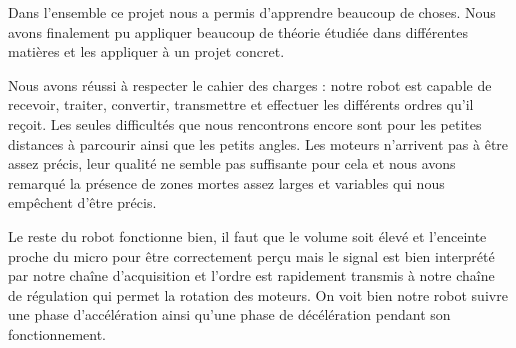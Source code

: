Dans l’ensemble ce projet nous a permis d’apprendre beaucoup de choses. Nous avons finalement pu appliquer beaucoup de théorie étudiée dans différentes matières et les appliquer à un projet concret. 

Nous avons réussi à respecter le cahier des charges : notre robot est capable de recevoir, traiter, convertir, transmettre et effectuer les différents ordres qu’il reçoit. Les seules difficultés que nous rencontrons encore sont pour les petites distances à parcourir ainsi que les petits angles. Les moteurs n’arrivent pas à être assez précis, leur qualité ne semble pas suffisante pour cela et nous avons remarqué la présence de zones mortes assez larges et variables qui nous empêchent d’être précis. 

Le reste du robot fonctionne bien, il faut que le volume soit élevé et l’enceinte proche du micro pour être correctement perçu mais le signal est bien interprété par notre chaîne d’acquisition et l’ordre est rapidement transmis à notre chaîne de régulation qui permet la rotation des moteurs. On voit bien notre robot suivre une phase d’accélération ainsi qu’une phase de décélération pendant son fonctionnement. 
